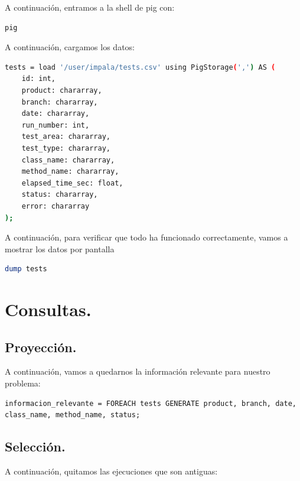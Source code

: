 \documentclass[10pt]{article}
\begin{document}
A continuación, entramos a la shell de pig con:

\begin{lstlisting}[frame=single, language=bash, xleftmargin=.25in, basicstyle=\small, upquote=true, breaklines = true]
pig
\end{lstlisting}

A continuación, cargamos los datos:

\begin{lstlisting}[frame=single, language=bash, xleftmargin=.25in, basicstyle=\small, upquote=true, breaklines = true]
tests = load '/user/impala/tests.csv' using PigStorage(',') AS (
	id: int,
	product: chararray,
	branch: chararray,
	date: chararray,
	run_number: int,
	test_area: chararray,
	test_type: chararray,
	class_name: chararray,
	method_name: chararray,
	elapsed_time_sec: float,
	status: chararray,
	error: chararray
);
\end{lstlisting}

A continuación, para verificar que todo ha funcionado correctamente, vamos a mostrar los datos por pantalla

\begin{lstlisting}[frame=single, language=sql, xleftmargin=.25in, basicstyle=\small, upquote=true, breaklines = true]
dump tests
\end{lstlisting}

\section{Consultas.}

\subsection{Proyección.}

A continuación, vamos a quedarnos la información relevante para nuestro problema:

\begin{lstlisting}[frame=single, xleftmargin=.25in, basicstyle=\small, upquote=true, breaklines = true]
informacion_relevante = FOREACH tests GENERATE product, branch, date, class_name, method_name, status;
\end{lstlisting}

\subsection{Selección.}

A continuación, quitamos las ejecuciones que son antiguas:
\end{document}
